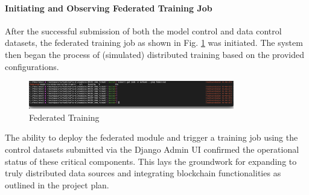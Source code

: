 \paragraph{Initiating and Observing Federated Training Job}
After the successful submission of both the model control and data control datasets, the federated training job as shown in Fig. \ref{fig:federated_training_job} was initiated. The system then began the process of (simulated) distributed training based on the provided configurations.
\begin{figure}[h!]
    \centering
     \includegraphics[width=0.8\textwidth]{MWP-Project Report Template - BD-ML-June25/screenshots_federated/7_Federated_Training_Job_Running.png}
   \caption{Federated Training}
    \label{fig:federated_training_job}
\end{figure}

The ability to deploy the federated module and trigger a training job using the control datasets submitted via the Django Admin UI confirmed the operational status of these critical components. This lays the groundwork for expanding to truly distributed data sources and integrating blockchain functionalities as outlined in the project plan.


